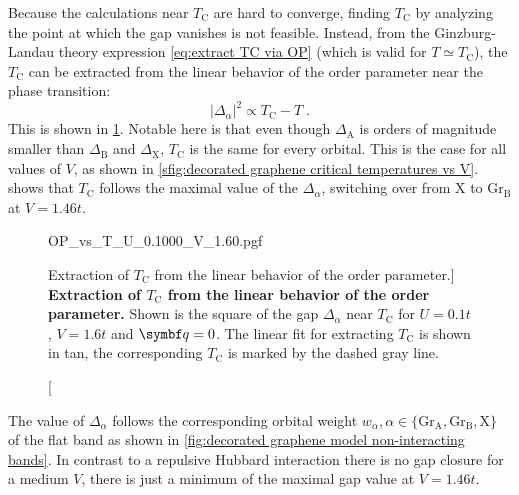 \documentclass[../notes.tex]{subfiles}
\begin{document}
Because the calculations near \(T_{\mathrm{C}}\) are hard to converge, finding \(T_{\mathrm{C}}\) by analyzing the point at which the gap vanishes is not feasible.
Instead, from the Ginzburg-Landau theory expression \cref{eq:extract TC via OP} (which is valid for \(T \simeq T_{\mathrm{C}}\)), the \(T_{\mathrm{C}}\) can be extracted from the linear behavior of the order parameter near the phase transition:
\begin{equation}
	\vert \Delta_{\alpha} \vert^2 \propto T_{\mathrm{C}} - T \;.
\end{equation}
This is shown in \cref{fig:decorated graphene OP vs T}.
Notable here is that even though \(\Delta_{\mathrm{A}}\) is orders of magnitude smaller than \(\Delta_{\mathrm{B}}\) and \(\Delta_{\mathrm{X}}\), \(T_{\mathrm{C}}\) is the same for every orbital.
This is the case for all values of \(V\), as shown in \cref{sfig:decorated graphene critical temperatures vs V}.
 shows that \(T_{\mathrm{C}}\) follows the maximal value of the \(\Delta_{\alpha}\), switching over from \(\mathrm{X}\) to \(\mathrm{Gr}_{\mathrm{B}}\) at \(V = 1.46t\).
\begin{figure}[tb]
	\centering
	{OP_vs_T_U_0.1000_V_1.60.pgf}
	\caption
	[Extraction of \(T_{\mathrm{C}}\) from the linear behavior of the order parameter.]{
		\textbf{Extraction of \(T_{\mathrm{C}}\) from the linear behavior of the order parameter.}
		Shown is the square of the gap \(\Delta_{\alpha}\) near \(T_{\mathrm{C}}\) for \(U = 0.1 t\), \(V = 1.6 t\) and \(\vb{q} = 0\). The linear fit for extracting \(T_{\mathrm{C}}\) is shown in tan, the corresponding \(T_{\mathrm{C}}\) is marked by the dashed gray line.
	}
	\label{fig:decorated graphene OP vs T}
\end{figure}

The value of \(\Delta_{\alpha}\) follows the corresponding orbital weight \(w_{\alpha}, \alpha \in \{\mathrm{Gr}_{\mathrm{A}}, \mathrm{Gr}_{\mathrm{B}}, \mathrm{X}\}\) of the flat band as shown in \cref{fig:decorated graphene model non-interacting bands}.
In contrast to a repulsive Hubbard interaction \cite{wittQuantumGeometryLocal2025} there is no gap closure for a medium \(V\), there is just a minimum of the maximal gap value at \(V = 1.46t\).
\end{document}
